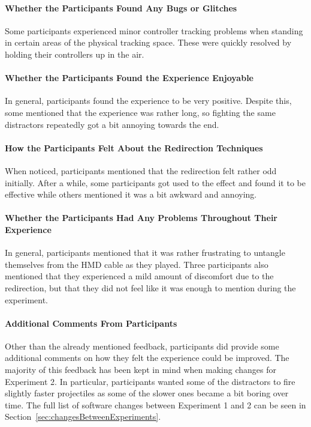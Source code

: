\paragraph{Whether the Participants Found Any Bugs or Glitches}
Some participants experienced minor controller tracking problems when standing in certain areas of the physical tracking space. These were quickly resolved by holding their controllers up in the air. 

\paragraph{Whether the Participants Found the Experience Enjoyable}
In general, participants found the experience to be very positive. Despite this, some mentioned that the experience was rather long, so fighting the same distractors repeatedly got a bit annoying towards the end.

\paragraph{How the Participants Felt About the Redirection Techniques}
When noticed, participants mentioned that the redirection felt rather odd initially. After a while, some participants got used to the effect and found it to be effective while others mentioned it was a bit awkward and annoying. 

\paragraph{Whether the Participants Had Any Problems Throughout Their Experience}
In general, participants mentioned that it was rather frustrating to untangle themselves from the HMD cable as they played. Three participants also mentioned that they experienced a mild amount of discomfort due to the redirection, but that they did not feel like it was enough to mention during the experiment. 

\paragraph{Additional Comments From Participants}
Other than the already mentioned feedback, participants did provide some additional comments on how they felt the experience could be improved. The majority of this feedback has been kept in mind when making changes for Experiment 2. In particular, participants wanted some of the distractors to fire slightly faster projectiles as some of the slower ones became a bit boring over time. The full list of software changes between Experiment 1 and 2 can be seen in Section~\ref{sec:changesBetweenExperiments}.

